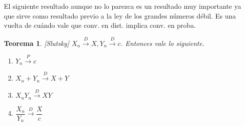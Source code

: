 \documentclass[11pt]{article}
\theoremstyle{plain} %
\newtheorem{teorema}{Teorema}
\theoremstyle{definition}
\theoremstyle{remark}
\newcommand{\proba}{\overset{P}{\to}}
\newcommand{\dist}{\overset{D}{\to}}
\begin{document}
\medskip

El siguiente resultado aunque no lo parezca es un resultado muy importante ya que sirve como resultado previo a la ley de los grandes números débil. Es una vuelta de cuándo vale que conv. en dist. implica conv. en proba.
\begin{teorema}
	\label{teo:slutsky}
	[Slutsky]
	$X_n \dist X , Y_n \dist c$. Entonces vale lo siguiente.
	\begin{enumerate}
		\item $Y_n \proba c$
		\item $X_n + Y_n \dist X + Y$
		\item $X_{n}Y_{n} \dist XY$ 
		\item $\dfrac{X_{n}}{Y_n} \dist \dfrac{X}{c}$
	\end{enumerate}
\end{teorema}
\end{document}
